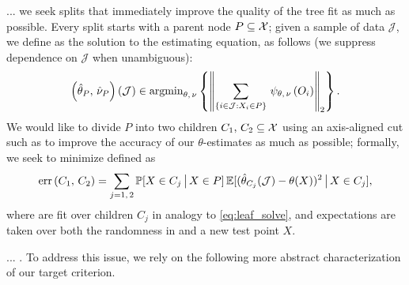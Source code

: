 \documentclass[aos]{imsart}
\theoremstyle{plain}
\theoremstyle{definition}
\theoremstyle{remark}
\begin{document}
\begin{CJK}{UTF8}{gbsn}
... we seek splits that immediately improve the quality of the tree fit as much as possible. Every split starts with a parent node $P \subseteq \mathcal{X}$; given a sample of data $\mathcal{J}$, we define
 as the solution to the estimating equation, as follows
(we suppress dependence on $\mathcal{J}$ when unambiguous):
\begin{equation}
\label{eq:leaf_solve}
\p{\htheta_P, \, \hnu_P}(\mathcal{J}) \in \argmin_{\theta, \, \nu} \cb{\Norm{\sum_{\cb{i\in\mathcal{J} : X_i \in P}} \, \psi_{\theta, \, \nu}\p{O_i}}_2}.
\end{equation}
We would like to divide $P$ into two children $C_1, \, C_2 \subseteq \mathcal{X}$ using an axis-aligned
cut such as to improve the accuracy of our $\theta$-estimates as much as possible;
formally, we seek to minimize  defined as
\begin{equation*}
\label{eq:err_criterion}
 \err\p{C_1, \, C_2} = \sum_{j = 1, \, 2}
 \mathbb{P}[X \in C_j \cond X \in P] \, \mathbb{E}[(\htheta_{C_j}(\mathcal{J}) - \theta(X))^2 \cond X \in C_j],
\end{equation*}
where  are fit over children $C_j$ in analogy to \eqref{eq:leaf_solve},
and expectations are taken over both the randomness in  and a
new test point $X$.


... . To address this issue, we rely on the following more abstract characterization of our target criterion. 


\end{CJK}
\end{document}
